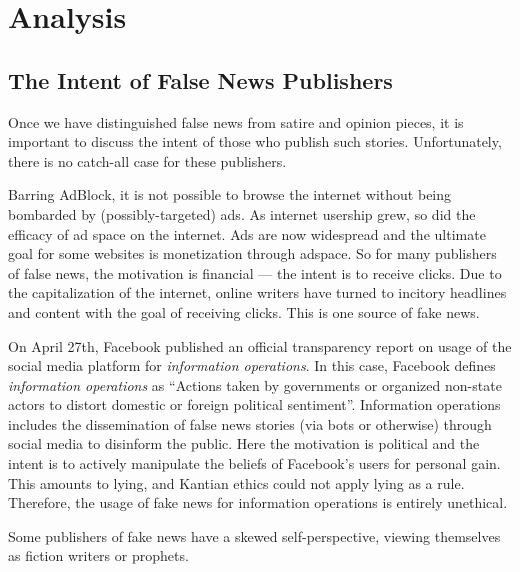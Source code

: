 
\section{Analysis}





\subsection{The Intent of False News Publishers}

\par Once we have distinguished false news from satire and opinion pieces, it is important to discuss the intent of those who publish such stories. Unfortunately, there is no catch-all case for these publishers.

\par Barring AdBlock, it is not possible to browse the internet without being bombarded by (possibly-targeted) ads. As internet usership grew, so did the efficacy of ad space on the internet. Ads are now widespread and the ultimate goal for some websites is monetization through adspace. \cite{bbc_clickbait} So for many publishers of false news, the motivation is financial --- the intent is to receive clicks. Due to the capitalization of the internet, online writers have turned to incitory headlines and content with the goal of receiving clicks. This is one source of fake news.

\par On April 27th, Facebook published an official transparency report on usage of the social media platform for \emph{information operations}. In this case, Facebook defines \emph{information operations} as ``Actions taken by governments or organized non-state
actors to distort domestic or foreign political sentiment''. \cite{fb_info_ops} Information operations includes the dissemination of false news stories (via bots or otherwise) through social media to disinform the public. Here the motivation is political and the intent is to actively manipulate the beliefs of Facebook's users for personal gain. This amounts to lying, and Kantian ethics could not apply lying as a rule. \cite{kant} Therefore, the usage of fake news for information operations is entirely unethical.

\par Some publishers of fake news have a skewed self-perspective, viewing themselves as fiction writers or prophets. \cite{cbs_fake_news}

